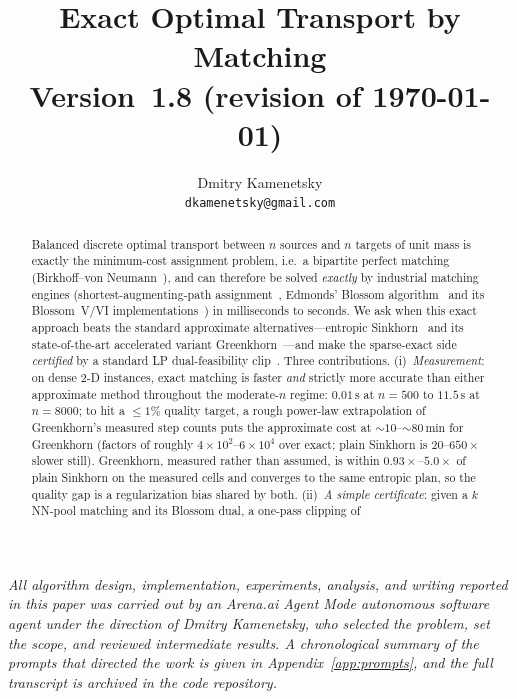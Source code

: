 \documentclass[11pt]{article}
\title{\bf Exact Optimal Transport by Matching\\[4pt]
\normalfont\small Version~1.8 (revision of \today)}
\author{
Dmitry Kamenetsky
\\[2pt]
\small\texttt{dkamenetsky@gmail.com}
}
\date{}
\theoremstyle{remark}
\begin{document}
\maketitle

{\centering\small\itshape
All algorithm design, implementation, experiments, analysis, and writing
reported in this paper was carried out by an Arena.ai Agent Mode
autonomous software agent under the direction of Dmitry Kamenetsky, who selected the
problem, set the scope, and reviewed intermediate results. A chronological
summary of the prompts that directed the work is given in
Appendix~\ref{app:prompts}, and the full transcript is archived in the
code repository.
\par\vspace{8pt}\par}

\begin{abstract}
Balanced discrete optimal transport between $n$ sources and $n$ targets of
unit mass is exactly the minimum-cost assignment problem, i.e.\ a bipartite
perfect matching (Birkhoff--von Neumann~\cite{birkhoff1946}), and can
therefore be solved \emph{exactly} by industrial matching engines
(shortest-augmenting-path assignment~\cite{jonker1987}, Edmonds' Blossom
algorithm~\cite{edmonds1965} and its Blossom~V/VI
implementations~\cite{blossomv,blossomvi}) in milliseconds to seconds. We
ask when this exact approach beats the standard approximate
alternatives---entropic Sinkhorn~\cite{sinkknopp1967,cuturi2013} and its
state-of-the-art accelerated variant Greenkhorn~\cite{awr2017,lin2022}---and
make the sparse-exact side \emph{certified} by a standard LP dual-feasibility
clip~\cite{schrijver2003}. Three contributions.
(i)~\emph{Measurement}: on dense 2-D instances, exact matching is faster
\emph{and} strictly more accurate than either approximate method throughout
the moderate-$n$ regime: $0.01\,\mathrm{s}$ at $n=500$ to
$11.5\,\mathrm{s}$ at $n=8000$; to hit a $\le 1\%$ quality target, a rough
power-law extrapolation of Greenkhorn's measured step counts puts the
approximate cost at $\sim\!10$--$\sim\!80\,\mathrm{min}$ for Greenkhorn
(factors of roughly $4{\times}10^2$--$6{\times}10^4$ over exact; plain
Sinkhorn is $20$--$650\times$ slower still). Greenkhorn, measured rather
than assumed, is within $0.93\times$--$5.0\times$ of plain Sinkhorn on the
measured cells and converges to the same entropic plan, so the quality gap
is a regularization bias shared by both. (ii)~\emph{A simple certificate}:
given a $k$NN-pool matching and its Blossom dual, a one-pass clipping of

\end{abstract}
\end{document}
